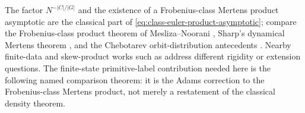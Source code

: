 \documentclass[11pt,a4paper]{amsart}
\theoremstyle{plain}
\theoremstyle{definition}
\theoremstyle{remark}
\begin{document}
The factor \(N^{-|C|/|G|}\) and the existence of a Frobenius-class Mertens
product asymptotic are the classical part of
\eqref{eq:class-euler-product-asymptotic}; compare the Frobenius-class product
theorem of Mesliza--Noorani \cite{MeslizaNoorani1999FrobeniusMertens},
Sharp's dynamical Mertens theorem \cite{Sharp1991Mertens}, and the Chebotarev
orbit-distribution antecedents
\cite{ParryPollicott1986Chebotarev,NooraniParry1992ChebotarevShifts}.
Nearby finite-data and skew-product works such as
\cite{CrismaleDelVecchioGrisetaRossi2025NoncommutativeSkewProduct,OHare2025FiniteDataRigidity}
address different rigidity or extension questions.  The finite-state
primitive-label contribution needed here is the following named comparison
theorem: it is the Adams correction to the Frobenius-class Mertens product,
not merely a restatement of the classical density theorem.
\end{document}
